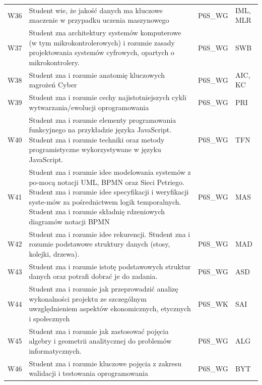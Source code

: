 \documentclass[12pt,a4paper]{article}
\begin{document}
{\begin{longtable}{m{1cm}m{8.8cm}m{2.1cm}m{2.5cm}}
\rowcolor{tableRowAlt} W36 & Student wie, że jakość danych ma kluczowe znaczenie w przypadku uczenia maszynowego & {\scriptsize P6S\_WG} & {\scriptsize IML, MLR} \\
\rowcolor{tableRowLight} W37 & Student zna architektury systemów komputerowe (w tym mikrokontrolerowych) i rozumie zasady projektowania systemów cyfrowych, opartych o mikrokontrolery. & {\scriptsize P6S\_WG} & {\scriptsize SWB} \\
\rowcolor{tableRowAlt} W38 & Student zna i rozumie anatomię kluczowych zagrożeń Cyber & {\scriptsize P6S\_WG} & {\scriptsize AIC, KC} \\
\rowcolor{tableRowLight} W39 & Student zna i rozumie cechy najistotniejszych cykli wytwarzania/ewolucji oprogramowania & {\scriptsize P6S\_WG} & {\scriptsize PRI} \\
\rowcolor{tableRowAlt} W40 & Student zna i rozumie elementy programowania funkcyjnego na przykładzie języka JavaScript. Student zna i rozumie techniki oraz metody programistyczne wykorzystywane w języku JavaScript. & {\scriptsize P6S\_WG} & {\scriptsize TFN} \\
\rowcolor{tableRowLight} W41 & Student zna i rozumie idee modelowania systemów z po-mocą notacji UML, BPMN oraz Sieci Petriego. Student zna i rozumie idee specyfikacji i weryfikacji syste-mów za pośrednictwem logik temporalnych. Student zna i rozumie składnię rdzeniowych diagramów notacji BPMN & {\scriptsize P6S\_WG} & {\scriptsize MAS} \\
\rowcolor{tableRowAlt} W42 & Student zna i rozumie idee rekurencji. Student zna i rozumie podstawowe struktury danych (stosy, kolejki, drzewa). & {\scriptsize P6S\_WG} & {\scriptsize MAD} \\
\rowcolor{tableRowLight} W43 & Student zna i rozumie istotę podstawowych struktur danych oraz potrafi dobrać je do zadania. & {\scriptsize P6S\_WG} & {\scriptsize ASD} \\
\rowcolor{tableRowAlt} W44 & Student zna i rozumie jak przeprowadzić analizę wykonalności projektu ze szczególnym uwzględnieniem aspektów ekonomicznych, etycznych i społecznych & {\scriptsize P6S\_WK} & {\scriptsize SAI} \\
\rowcolor{tableRowLight} W45 & Student zna i rozumie jak zastosować pojęcia algebry i geometrii analitycznej do problemów informatycznych. & {\scriptsize P6S\_WG} & {\scriptsize ALG} \\
\rowcolor{tableRowAlt} W46 & Student zna i rozumie kluczowe pojęcia z zakresu walidacji i testowania oprogramowania & {\scriptsize P6S\_WG} & {\scriptsize BYT} \\

\end{longtable}}
\end{document}
